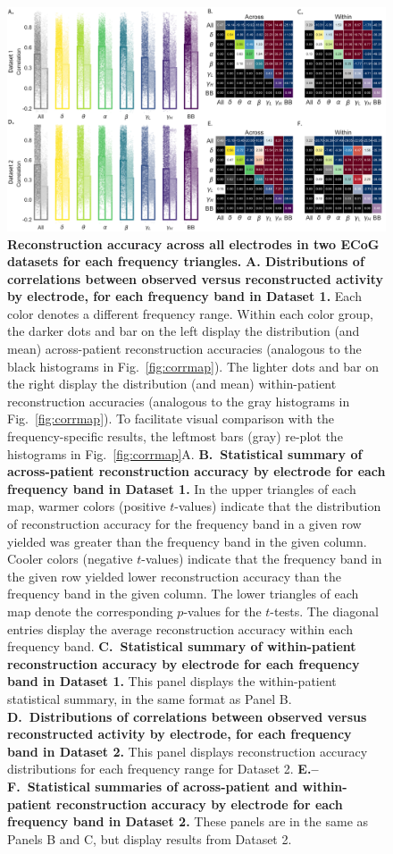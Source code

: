 \documentclass[11pt]{article}
\begin{document}
\begin{figure}
  \centering \includegraphics[width=\textwidth]{figs/frequency}
  \caption{\textbf{Reconstruction accuracy across all electrodes in two ECoG
  datasets for each frequency triangles.} \textbf{A. Distributions of
  correlations between observed versus reconstructed activity by electrode, for
  each frequency band in Dataset 1.}  Each color denotes a different frequency
  range. Within each color group, the darker dots and bar on the left display
  the distribution (and mean) across-patient reconstruction accuracies
  (analogous to the black histograms in Fig.~\ref{fig:corrmap}).  The lighter
  dots and bar on the right display the distribution (and mean) within-patient
  reconstruction accuracies (analogous to the gray histograms in
  Fig.~\ref{fig:corrmap}). To facilitate visual comparison with the
  frequency-specific results, the leftmost bars (gray) re-plot the histograms in
  Fig.~\ref{fig:corrmap}A. \textbf{B.~Statistical summary of across-patient
  reconstruction accuracy by electrode for each frequency band in Dataset 1.} In
  the upper triangles of each map, warmer colors (positive $t$-values) indicate
  that the distribution of reconstruction accuracy for the frequency band in a
  given row yielded was greater than the frequency band in the given column.
  Cooler colors (negative $t$-values) indicate that the frequency band in the
  given row yielded lower reconstruction accuracy than the frequency band in the
  given column. The lower triangles of each map denote the corresponding
  $p$-values for the $t$-tests. The diagonal entries display the average
  reconstruction accuracy within each frequency band. \textbf{C.~Statistical
  summary of within-patient reconstruction accuracy by electrode for each
  frequency band in Dataset 1.} This panel displays the within-patient
  statistical summary, in the same format as Panel B.  \textbf{D.~Distributions
  of correlations between observed versus reconstructed activity by electrode,
  for each frequency band in Dataset 2.}  This panel displays reconstruction
  accuracy distributions for each frequency range for Dataset 2.
  \textbf{E.--F.~Statistical summaries of across-patient and within-patient
  reconstruction accuracy by electrode for each frequency band in Dataset 2.}
  These panels are in the same as Panels B and C, but display results from
  Dataset 2.} \label{fig:frequency}
\end{figure}
\end{document}
